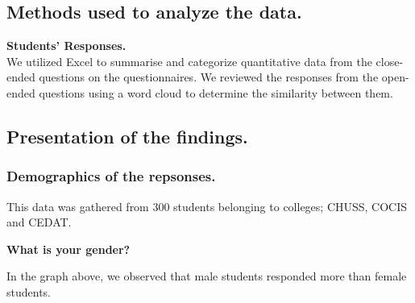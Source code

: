 \documentclass{article}
\begin{document}
\subsection{Methods used to analyze the data.}
\textbf{Students' Responses.}\\
We utilized Excel to summarise and categorize quantitative data from the close-ended questions on the questionnaires. We reviewed the responses from the open-ended questions using a word cloud to determine the similarity between them.

\subsection{Presentation of the findings.}
\subsubsection{Demographics of the repsonses.}

This data was gathered from 300 students belonging to colleges; CHUSS, COCIS and CEDAT.

\vspace{10pt}
\noindent\textbf{What is your gender?}
\begin{center}
\end{center}

\noindent In the graph above, we observed that male students responded more than female students.
\end{document}
